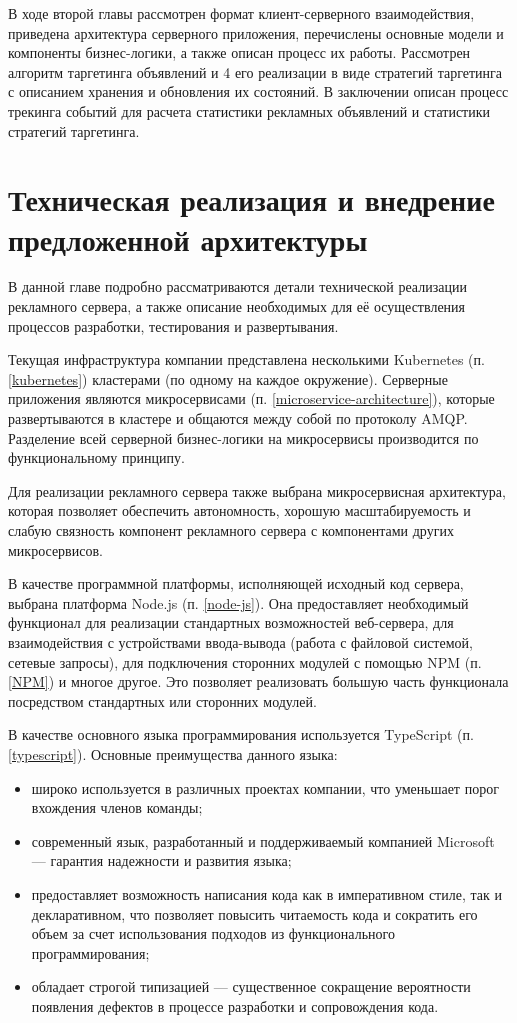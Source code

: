 \documentclass[specification,annotation,times]{itmo-student-thesis}
\begin{document}
В ходе второй главы рассмотрен формат клиент-серверного взаимодействия, приведена архитектура серверного приложения, перечислены основные модели и компоненты бизнес-логики, а также описан процесс их работы. Рассмотрен алгоритм таргетинга объявлений и 4 его реализации в виде стратегий таргетинга с описанием хранения и обновления их состояний. В заключении описан процесс трекинга событий для расчета статистики рекламных объявлений и статистики стратегий таргетинга.



\chapter{Техническая реализация и внедрение предложенной архитектуры}

В данной главе подробно рассматриваются детали технической реализации рекламного сервера, а также описание необходимых для её осуществления процессов разработки, тестирования и развертывания.

Текущая инфраструктура компании представлена несколькими Kubernetes (п. \ref{kubernetes}) кластерами (по одному на каждое окружение). Серверные приложения являются микросервисами (п. \ref{microservice-architecture}), которые развертываются в кластере и общаются между собой по протоколу AMQP. Разделение всей серверной бизнес-логики на микросервисы производится по функциональному принципу. 

Для реализации рекламного сервера также выбрана микросервисная архитектура, которая позволяет обеспечить автономность, хорошую масштабируемость и слабую связность компонент рекламного сервера с компонентами других микросервисов.

В качестве программной платформы, исполняющей исходный код сервера, выбрана платформа Node.js (п. \ref{node-js}). Она предоставляет необходимый функционал для реализации стандартных возможностей веб-сервера,  для взаимодействия с устройствами ввода-вывода (работа с файловой системой, сетевые запросы), для подключения сторонних модулей с помощью NPM (п. \ref{NPM}) и многое другое. Это позволяет реализовать большую часть функционала посредством стандартных или сторонних модулей. 

В качестве основного языка программирования используется TypeScript (п. \ref{typescript}). Основные преимущества данного языка:
\begin{itemize}
\item широко используется в различных проектах компании, что уменьшает порог вхождения членов команды;
\item современный язык, разработанный и поддерживаемый компанией Microsoft — гарантия надежности и развития языка;
\item предоставляет возможность написания кода как в императивном стиле, так и декларативном, что позволяет повысить читаемость кода и сократить его объем за счет использования подходов из функционального программирования;
\item обладает строгой типизацией — существенное сокращение вероятности появления дефектов в процессе разработки и сопровождения кода.
\end{itemize}
\end{document}
